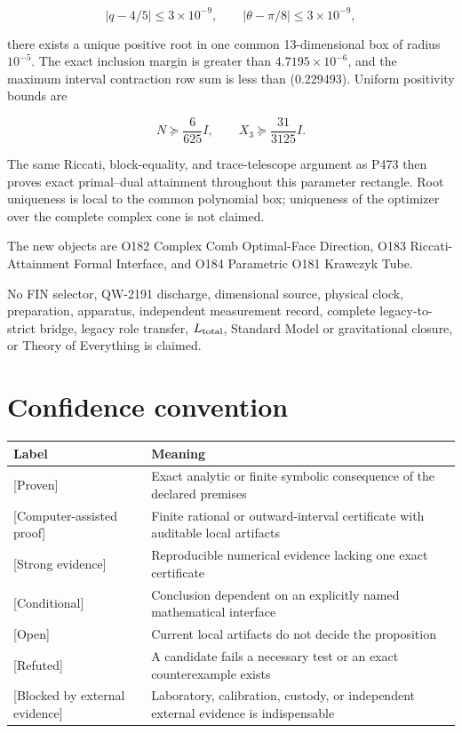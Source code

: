\documentclass[11pt,a4paper,openany]{report}
\newcommand{\statusProven}{\textcolor{fingreen}{[Proven]}}
\newcommand{\statusStrong}{\textcolor{finblue}{[Strong evidence]}}
\newcommand{\statusRefuted}{\textcolor{finred}{[Refuted]}}
\begin{document}
\begin{enumerate}
\[
   |q-4/5|\le 3\times10^{-9},\qquad
   |\theta-\pi/8|\le 3\times10^{-9},
   \]

there exists a unique positive root in one common 13-dimensional box of radius \(10^{-5}\). The exact inclusion margin is greater than \(4.7195\times10^{-6}\), and the maximum interval contraction row sum is less than (0.229493). Uniform positivity bounds are

\[
   N\succeq \frac{6}{625}I,
   \qquad
   X_3\succeq \frac{31}{3125}I.
   \]

The same Riccati, block-equality, and trace-telescope argument as P473 then proves exact primal--dual attainment throughout this parameter rectangle. Root uniqueness is local to the common polynomial box; uniqueness of the optimizer over the complete complex cone is not claimed.

\end{enumerate}

The new objects are O182 Complex Comb Optimal-Face Direction, O183 Riccati-Attainment Formal Interface, and O184 Parametric O181 Krawczyk Tube.

No FIN selector, QW-2191 discharge, dimensional source, physical clock, preparation, apparatus, independent measurement record, complete legacy-to-strict bridge, legacy role transfer, \(L_{\rm total}\), Standard Model or gravitational closure, or Theory of Everything is claimed.

\chapter{Confidence convention}

\begin{center}
\begingroup\small
\setlength{\tabcolsep}{2.5pt}
\renewcommand{\arraystretch}{1.16}
\begin{longtable}{@{}p{}p{}@{}}
\toprule
\textbf{Label} & \textbf{Meaning} \\
\midrule
\endhead
\statusProven{} & Exact analytic or finite symbolic consequence of the declared premises \\
\textcolor{fingreen}{[Computer-assisted proof]} & Finite rational or outward-interval certificate with auditable local artifacts \\
\statusStrong{} & Reproducible numerical evidence lacking one exact certificate \\
\textcolor{finviolet}{[Conditional]} & Conclusion dependent on an explicitly named mathematical interface \\
\textcolor{finorange}{[Open]} & Current local artifacts do not decide the proposition \\
\statusRefuted{} & A candidate fails a necessary test or an exact counterexample exists \\
\textcolor{finred}{[Blocked by external evidence]} & Laboratory, calibration, custody, or independent external evidence is indispensable \\
\bottomrule
\end{longtable}
\endgroup
\end{center}
\end{document}
